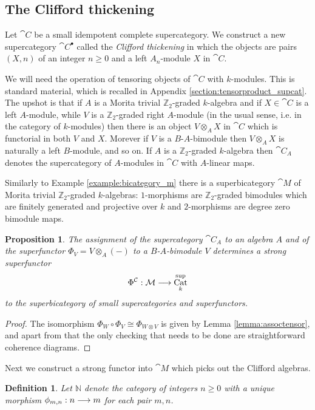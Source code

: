 \documentclass[english,letter paper,12pt,leqno]{article}
\newtheorem{proposition}[theorem]{Proposition}
\theoremstyle{example}
\newtheorem{definition}[theorem]{Definition}
\numberwithin{equation}{section}
\DeclareMathOperator{\Cat}{Cat}
\begin{document}
\subsection{The Clifford thickening}

Let $\cat{C}$ be a small idempotent complete supercategory. We construct a new supercategory $\cat{C}^\bullet$ called the \emph{Clifford thickening} in which the objects are pairs $(X,n)$ of an integer $n \ge 0$ and a left $A_n$-module $X$ in $\cat{C}$.

We will need the operation of tensoring objects of $\cat{C}$ with $k$-modules. This is standard material, which is recalled in Appendix \ref{section:tensorproduct_supcat}. The upshot is that if $A$ is a Morita trivial $\mathbb{Z}_2$-graded $k$-algebra and if $X \in \cat{C}$ is a left $A$-module, while $V$ is a $\mathbb{Z}_2$-graded right $A$-module (in the usual sense, i.e. in the category of $k$-modules) then there is an object $V \otimes_A X$ in $\cat{C}$ which is functorial in both $V$ and $X$. Morever if $V$ is a $B$-$A$-bimodule then $V \otimes_A X$ is naturally a left $B$-module, and so on. If $A$ is a $\mathbb{Z}_2$-graded $k$-algebra then $\cat{C}_A$ denotes the supercategory of $A$-modules in $\cat{C}$ with $A$-linear maps.

Similarly to Example \ref{example:bicategory_m} there is a superbicategory $\cat{M}$ of Morita trivial $\mathbb{Z}_2$-graded $k$-algebras: $1$-morphisms are $\mathbb{Z}_2$-graded bimodules which are finitely generated and projective over $k$ and $2$-morphisms are degree zero bimodule maps.

\begin{proposition} The assignment of the supercategory $\cat{C}_A$ to an algebra $A$ and of the superfunctor $\Phi_V = V \otimes_A (-)$ to a $B$-$A$-bimodule $V$ determines a strong superfunctor
\[
\Phi^{\cat{C}}: \cat{M} \lto \Cat^{\operatorname{sup}}_k
\]
to the superbicategory of small supercategories and superfunctors.
\end{proposition}
\begin{proof}
The isomorphism $\Phi_W \circ \Phi_V \cong \Phi_{W \otimes V}$ is given by Lemma \ref{lemma:assoctensor}, and apart from that the only checking that needs to be done are straightforward coherence diagrams.
\end{proof}

Next we construct a strong functor into $\cat{M}$ which picks out the Clifford algebras.

\begin{definition}
Let $\mathbb{N}$ denote the category of integers $n \ge 0$ with a unique morphism $\phi_{m,n}: n \longrightarrow m$ for each pair $m,n$. %
\end{definition}
\end{document}
